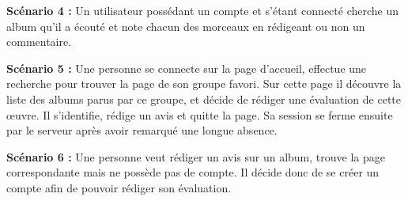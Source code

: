     \begin{paragraphe}
        \textbf{Scénario 4 :}
        Un utilisateur possédant un compte et s'étant connecté cherche un album qu'il
        a écouté et note chacun des morceaux en rédigeant ou non un commentaire.
    \end{paragraphe}

    \begin{paragraphe}
        \textbf{Scénario 5 :}
        Une personne se connecte sur la page d’accueil, effectue une recherche pour
        trouver la page de son groupe favori. Sur cette page il découvre la liste
        des albums parus par ce groupe, et décide de rédiger une évaluation de cette
        œuvre. Il s’identifie, rédige un avis et quitte la page. Sa session se
        ferme ensuite par le serveur après avoir remarqué une longue absence.
    \end{paragraphe}

    \begin{paragraphe}
        \textbf{Scénario 6 :}
        Une personne veut rédiger un avis sur un album, trouve la page
        correspondante mais ne possède pas de compte. Il décide donc de se créer un
        compte afin de pouvoir rédiger son évaluation.
    \end{paragraphe}
